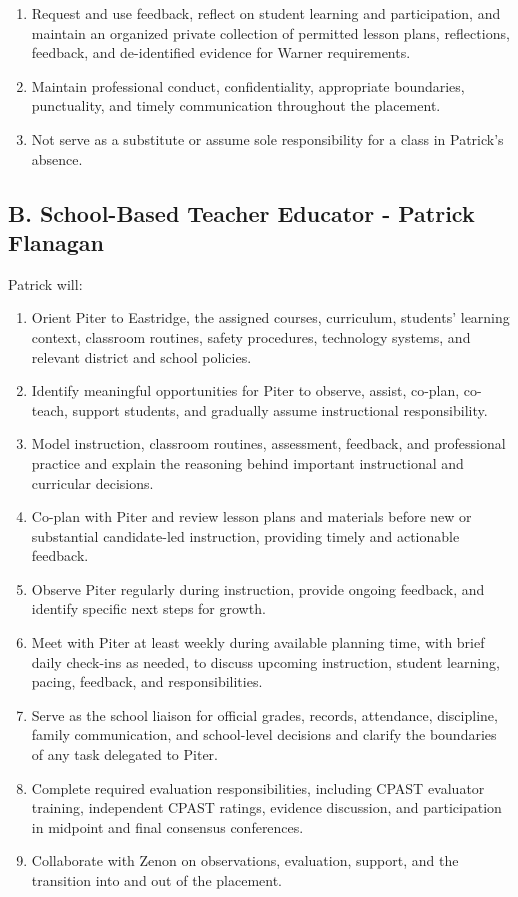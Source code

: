 \documentclass[10pt]{article}
\begin{document}
\begin{enumerate}
  \item Request and use feedback, reflect on student learning and participation, and maintain an organized private collection of permitted lesson plans, reflections, feedback, and de-identified evidence for Warner requirements.
  \item Maintain professional conduct, confidentiality, appropriate boundaries, punctuality, and timely communication throughout the placement.
  \item Not serve as a substitute or assume sole responsibility for a class in Patrick's absence.
\end{enumerate}

\subsection*{B. School-Based Teacher Educator - Patrick Flanagan}

Patrick will:
\begin{enumerate}
  \item Orient Piter to Eastridge, the assigned courses, curriculum, students' learning context, classroom routines, safety procedures, technology systems, and relevant district and school policies.
  \item Identify meaningful opportunities for Piter to observe, assist, co-plan, co-teach, support students, and gradually assume instructional responsibility.
  \item Model instruction, classroom routines, assessment, feedback, and professional practice and explain the reasoning behind important instructional and curricular decisions.
  \item Co-plan with Piter and review lesson plans and materials before new or substantial candidate-led instruction, providing timely and actionable feedback.
  \item Observe Piter regularly during instruction, provide ongoing feedback, and identify specific next steps for growth.
  \item Meet with Piter at least weekly during available planning time, with brief daily check-ins as needed, to discuss upcoming instruction, student learning, pacing, feedback, and responsibilities.
  \item Serve as the school liaison for official grades, records, attendance, discipline, family communication, and school-level decisions and clarify the boundaries of any task delegated to Piter.
  \item Complete required evaluation responsibilities, including CPAST evaluator training, independent CPAST ratings, evidence discussion, and participation in midpoint and final consensus conferences.
  \item Collaborate with Zenon on observations, evaluation, support, and the transition into and out of the placement.
\end{enumerate}
\end{document}
